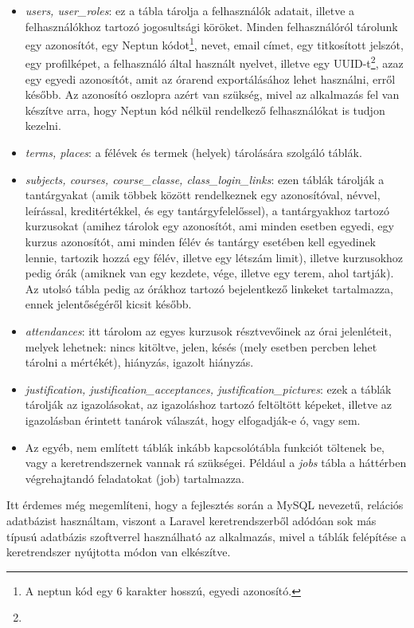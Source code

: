 \documentclass[
]{thesis-ekf}
\theoremstyle{definition}
\theoremstyle{remark}
\begin{document}
\begin{itemize}
	\item \emph{users, user\_roles}: ez a tábla tárolja a felhasználók adatait, illetve a felhasználókhoz tartozó jogosultsági köröket. Minden felhasználóról tárolunk egy azonosítót, egy Neptun\cite{Neptun} kódot\footnote{A neptun kód egy 6 karakter hosszú, egyedi azonosító.}, nevet, email címet, egy titkosított jelszót, egy profilképet, a felhasználó által használt nyelvet, illetve egy UUID-t\footnote{}, azaz egy egyedi azonosítót, amit az órarend exportálásához lehet használni, erről később. Az azonosító oszlopra azért van szükség, mivel az alkalmazás fel van készítve arra, hogy Neptun kód nélkül rendelkező felhasználókat is tudjon kezelni.
	\item \emph{terms, places}: a félévek és termek (helyek) tárolására szolgáló táblák.
	\item \emph{subjects, courses, course\_classe, class\_login\_links}: ezen táblák tárolják a tantárgyakat (amik többek között rendelkeznek egy azonosítóval, névvel, leírással, kreditértékkel, és egy tantárgyfelelőssel), a tantárgyakhoz tartozó kurzusokat (amihez tárolok egy azonosítót, ami minden esetben egyedi, egy kurzus azonosítót, ami minden félév és tantárgy esetében kell egyedinek lennie, tartozik hozzá egy félév, illetve egy létszám limit), illetve kurzusokhoz pedig órák (amiknek van egy kezdete, vége, illetve egy terem, ahol tartják). Az utolsó tábla pedig az órákhoz tartozó bejelentkező linkeket tartalmazza, ennek jelentőségéről kicsit később.
	\item  \emph{attendances}: itt tárolom az egyes kurzusok résztvevőinek az órai jelenléteit, melyek lehetnek: nincs kitöltve, jelen, késés (mely esetben percben lehet tárolni a mértékét), hiányzás, igazolt hiányzás.
	\item \emph{justification, justification\_acceptances, justification\_pictures}: ezek a táblák tárolják az igazolásokat, az igazoláshoz tartozó feltöltött képeket, illetve az igazolásban érintett tanárok válaszát, hogy elfogadják-e ó, vagy sem.
	\item Az egyéb, nem említett táblák inkább kapcsolótábla funkciót töltenek be, vagy a keretrendszernek vannak rá szükségei. Például a \emph{jobs} tábla a háttérben végrehajtandó feladatokat (job) tartalmazza.
\end{itemize}

Itt érdemes még megemlíteni, hogy a fejlesztés során a MySQL nevezetű, relációs adatbázist használtam, viszont a Laravel keretrendszerből adódóan sok más típusú adatbázis szoftverrel használható az alkalmazás, mivel a táblák felépítése a keretrendszer nyújtotta módon van elkészítve.
\end{document}
